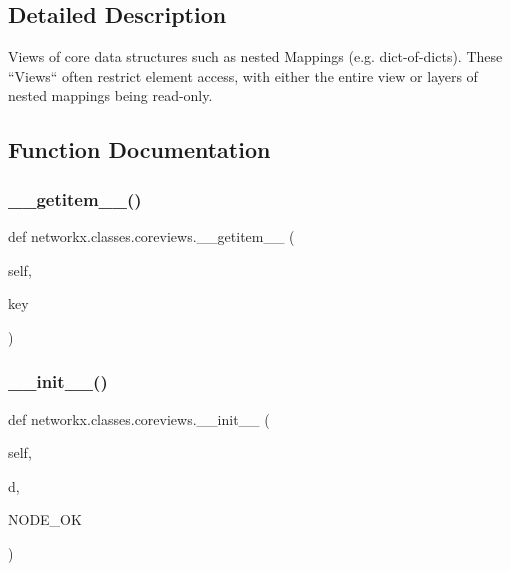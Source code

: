 \subsection{Detailed Description}
\begin{DoxyVerb}Views of core data structures such as nested Mappings (e.g. dict-of-dicts).
These ``Views`` often restrict element access, with either the entire view or
layers of nested mappings being read-only.
\end{DoxyVerb}
 

\subsection{Function Documentation}
\mbox{\label{namespacenetworkx_1_1classes_1_1coreviews_adc3ec68b23f9d2c95460985778bbbc3c}} 
\subsubsection{\texorpdfstring{\+\_\+\+\_\+getitem\+\_\+\+\_\+()}{\_\_getitem\_\_()}}
{\footnotesize\ttfamily def networkx.\+classes.\+coreviews.\+\_\+\+\_\+getitem\+\_\+\+\_\+ (\begin{DoxyParamCaption}\item[{}]{self,  }\item[{}]{key }\end{DoxyParamCaption})}

\mbox{\label{namespacenetworkx_1_1classes_1_1coreviews_ad036d09430f59529444c6b08517d58af}} 
\subsubsection{\texorpdfstring{\+\_\+\+\_\+init\+\_\+\+\_\+()}{\_\_init\_\_()}\hspace{0.1cm}{\footnotesize\ttfamily [1/2]}}
{\footnotesize\ttfamily def networkx.\+classes.\+coreviews.\+\_\+\+\_\+init\+\_\+\+\_\+ (\begin{DoxyParamCaption}\item[{}]{self,  }\item[{}]{d,  }\item[{}]{N\+O\+D\+E\+\_\+\+OK }\end{DoxyParamCaption})}

